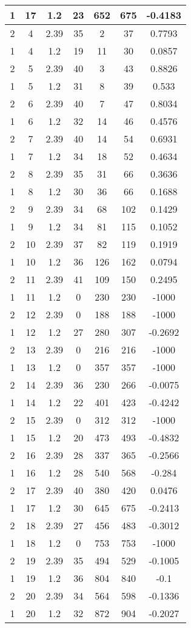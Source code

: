 \documentclass[letterpaper, 12pt]{article}
\begin{document}
\begin{longtable}{|c|c|c|c|c|c|c|}
\hline
1 & 17 & 1.2 & 23 & 652 & 675 & -0.4183 \\
\hline
2 & 4 & 2.39 & 35 & 2 & 37 & 0.7793 \\
\hline
1 & 4 & 1.2 & 19 & 11 & 30 & 0.0857 \\
\hline
2 & 5 & 2.39 & 40 & 3 & 43 & 0.8826 \\
\hline
1 & 5 & 1.2 & 31 & 8 & 39 & 0.533 \\
\hline
2 & 6 & 2.39 & 40 & 7 & 47 & 0.8034 \\
\hline
1 & 6 & 1.2 & 32 & 14 & 46 & 0.4576 \\
\hline
2 & 7 & 2.39 & 40 & 14 & 54 & 0.6931 \\
\hline
1 & 7 & 1.2 & 34 & 18 & 52 & 0.4634 \\
\hline
2 & 8 & 2.39 & 35 & 31 & 66 & 0.3636 \\
\hline
1 & 8 & 1.2 & 30 & 36 & 66 & 0.1688 \\
\hline
2 & 9 & 2.39 & 34 & 68 & 102 & 0.1429 \\
\hline
1 & 9 & 1.2 & 34 & 81 & 115 & 0.1052 \\
\hline
2 & 10 & 2.39 & 37 & 82 & 119 & 0.1919 \\
\hline
1 & 10 & 1.2 & 36 & 126 & 162 & 0.0794 \\
\hline
2 & 11 & 2.39 & 41 & 109 & 150 & 0.2495 \\
\hline
1 & 11 & 1.2 & 0 & 230 & 230 & -1000 \\
\hline
2 & 12 & 2.39 & 0 & 188 & 188 & -1000 \\
\hline
1 & 12 & 1.2 & 27 & 280 & 307 & -0.2692 \\
\hline
2 & 13 & 2.39 & 0 & 216 & 216 & -1000 \\
\hline
1 & 13 & 1.2 & 0 & 357 & 357 & -1000 \\
\hline
2 & 14 & 2.39 & 36 & 230 & 266 & -0.0075 \\
\hline
1 & 14 & 1.2 & 22 & 401 & 423 & -0.4242 \\
\hline
2 & 15 & 2.39 & 0 & 312 & 312 & -1000 \\
\hline
1 & 15 & 1.2 & 20 & 473 & 493 & -0.4832 \\
\hline
2 & 16 & 2.39 & 28 & 337 & 365 & -0.2566 \\
\hline
1 & 16 & 1.2 & 28 & 540 & 568 & -0.284 \\
\hline
2 & 17 & 2.39 & 40 & 380 & 420 & 0.0476 \\
\hline
1 & 17 & 1.2 & 30 & 645 & 675 & -0.2413 \\
\hline
2 & 18 & 2.39 & 27 & 456 & 483 & -0.3012 \\
\hline
1 & 18 & 1.2 & 0 & 753 & 753 & -1000 \\
\hline
2 & 19 & 2.39 & 35 & 494 & 529 & -0.1005 \\
\hline
1 & 19 & 1.2 & 36 & 804 & 840 & -0.1 \\
\hline
2 & 20 & 2.39 & 34 & 564 & 598 & -0.1336 \\
\hline
1 & 20 & 1.2 & 32 & 872 & 904 & -0.2027 \\
\hline
\end{longtable}
\end{document}
